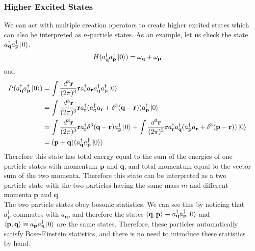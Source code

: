 \documentclass[11pt]{article}
\newcommand{\w}{\omega}
\numberwithin{equation}{section}
\begin{document}
    \subsubsection{Higher Excited States}
    We can act with multiple creation operators to create higher excited states which can also be interpreted as \(n\)-particle states. As an example, let us check the state \(a^\dagger_\textbf{q}a^\dagger_\textbf{p}\ket{0}\). 
    \begin{equation*}
        H(a^\dagger_\textbf{q}a^\dagger_\textbf{p}\ket{0}) = \w_\textbf{q} + \w_\textbf{p}
    \end{equation*}
    and 
    \begin{align*}
        P(a^\dagger_\textbf{q}a^\dagger_\textbf{p}\ket{0}) &= \int \frac{d^3\textbf{r}}{(2\pi)^3}\textbf{r}a^\dagger_\textbf{r}a_\textbf{r}a^\dagger_\textbf{q}a^\dagger_\textbf{p}\ket{0} \\
        &=\int \frac{d^3\textbf{r}}{(2\pi)^3}\textbf{r}a^\dagger_\textbf{r}( a^\dagger_\textbf{q}a_\textbf{r} +\delta^3(\textbf{q} - \textbf{r}) )a^\dagger_\textbf{p}\ket{0} \\
        &=\int \frac{d^3\textbf{r}}{(2\pi)^3}\textbf{r}a^\dagger_\textbf{r}\delta^3(\textbf{q} - \textbf{r})a^\dagger_\textbf{p}\ket{0}  + \int \frac{d^3\textbf{r}}{(2\pi)^3}\textbf{r}a^\dagger_\textbf{r}a^\dagger_\textbf{q}(a^\dagger_\textbf{p} a_\textbf{r} + \delta^3(\textbf{p} - \textbf{r}))\ket{0} \\
        &= (\textbf{p} + \textbf{q})(a^\dagger_\textbf{q}a^\dagger_\textbf{p}\ket{0} )
    \end{align*}
    Therefore this state has total energy equal to the sum of the energies of one particle states with momentum \(\textbf{p}\) and \(\textbf{q}\), and total momentum equal to the vector sum of the two momenta. Therefore this state can be interpreted as a two particle state with the two particles having the same mass \(m\) and different momenta \(\textbf{p}\) and \(\textbf{q}\).\\

    The two particle states obey bosonic statistics. We can see this by noticing that \(a^\dagger_\textbf{p}\) commutes with \(a^\dagger_\textbf{q}\), and therefore the states \(\braket{\textbf{q}, \textbf{p}}\equiv a^\dagger_\textbf{q}a^\dagger_\textbf{p}\ket{0}\) and \(\braket{\textbf{p}, \textbf{q}} \equiv a^\dagger_\textbf{p}a^\dagger_\textbf{q}\ket{0}\) are the same states. Therefore, these particles automatically satisfy Bose-Einstein statistics, and there is no need to introduce these statistics by hand.\\
\end{document}

